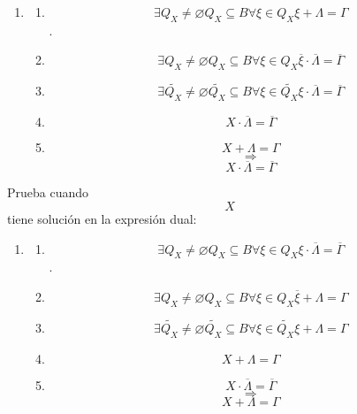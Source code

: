 \documentclass[
]{article}
\providecommand{\tightlist}{%
  \setlength{\itemsep}{0pt}\setlength{\parskip}{0pt}}
\begin{document}
\begin{enumerate}
\begin{enumerate}
\begin{enumerate}
\begin{enumerate}
\begin{enumerate}
          \begin{enumerate}
          \def\labelenumvi{\arabic{enumvi}.}
          \tightlist
          \item
            \begin{enumerate}
            \def\labelenumvii{\arabic{enumvii}.}
            \tightlist
            \item
              \[\exists{Q_{X} \neq \varnothing}{Q_{X} \subseteq B}\forall{\xi \in Q_{X}}{{\xi + \Lambda} = \Gamma}\].
            \item
              \[\exists{Q_{X} \neq \varnothing}{Q_{X} \subseteq B}\forall{\xi \in Q_{X}}{{\overline{\xi} \cdot \overline{\Lambda}} = \overline{\Gamma}}\]
            \item
              \[\exists{\widetilde{Q_{X}} \neq \varnothing}{\widetilde{Q_{X}} \subseteq B}\forall{\xi \in \widetilde{Q_{X}}}{{\xi \cdot \overline{\Lambda}} = \overline{\Gamma}}\]
            \item
              \[{X \cdot \overline{\Lambda}} = \overline{\Gamma}\]
            \item
              \[{X + \Lambda} = \Gamma\] \[\Rightarrow\]
              \[{X \cdot \overline{\Lambda}} = \overline{\Gamma}\]
            \end{enumerate}
          \end{enumerate}

          Prueba cuando \[X\] tiene solución en la expresión dual:

          \begin{enumerate}
          \def\labelenumvi{\arabic{enumvi}.}
          \tightlist
          \item
            \begin{enumerate}
            \def\labelenumvii{\arabic{enumvii}.}
            \tightlist
            \item
              \[\exists{Q_{X} \neq \varnothing}{Q_{X} \subseteq B}\forall{\xi \in Q_{X}}{{\xi \cdot \overline{\Lambda}} = \overline{\Gamma}}\].
            \item
              \[\exists{Q_{X} \neq \varnothing}{Q_{X} \subseteq B}\forall{\xi \in Q_{X}}{{\overline{\xi} + \Lambda} = \Gamma}\]
            \item
              \[\exists{\widetilde{Q_{X}} \neq \varnothing}{\widetilde{Q_{X}} \subseteq B}\forall{\xi \in \widetilde{Q_{X}}}{{\xi + \Lambda} = \Gamma}\]
            \item
              \[{X + \Lambda} = \Gamma\]
            \item
              \[{X \cdot \overline{\Lambda}} = \overline{\Gamma}\]
              \[\Rightarrow\] \[{X + \Lambda} = \Gamma\]
            \end{enumerate}
          \end{enumerate}


\end{enumerate}
\end{enumerate}
\end{enumerate}
\end{enumerate}
\end{enumerate}
\end{document}
